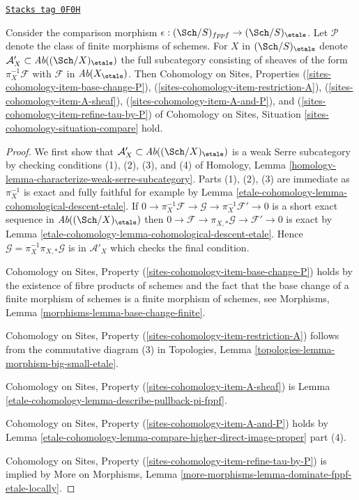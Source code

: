 \begin{lemma}
\label{etale-cohomology-lemma-compare-fppf-etale}
\href{https://stacks.math.columbia.edu/tag/0F0H}{\texttt{Stacks tag 0F0H}}

Consider the comparison morphism
$\epsilon : (\Sch/S)_{fppf} \to (\Sch/S)_\etale$.
Let $\mathcal{P}$ denote the class of finite morphisms of schemes.
For $X$ in $(\Sch/S)_\etale$ denote
$\mathcal{A}'_X \subset \textit{Ab}((\Sch/X)_\etale)$
the full subcategory consisting of sheaves of the form
$\pi_X^{-1}\mathcal{F}$ with $\mathcal{F}$ in $\textit{Ab}(X_\etale)$.
Then Cohomology on Sites, Properties
(\ref{sites-cohomology-item-base-change-P}),
(\ref{sites-cohomology-item-restriction-A}),
(\ref{sites-cohomology-item-A-sheaf}),
(\ref{sites-cohomology-item-A-and-P}), and
(\ref{sites-cohomology-item-refine-tau-by-P})
of Cohomology on Sites, Situation
\ref{sites-cohomology-situation-compare} hold.
\end{lemma}

\begin{proof}
We first show that $\mathcal{A}'_X \subset \textit{Ab}((\Sch/X)_\etale)$
is a weak Serre subcategory by checking conditions (1), (2), (3), and (4)
of Homology, Lemma \ref{homology-lemma-characterize-weak-serre-subcategory}.
Parts (1), (2), (3) are immediate as $\pi_X^{-1}$ is exact and
fully faithful for example by Lemma \ref{etale-cohomology-lemma-cohomological-descent-etale}. If
$0 \to \pi_X^{-1}\mathcal{F} \to \mathcal{G} \to \pi_X^{-1}\mathcal{F}' \to 0$
is a short exact sequence in $\textit{Ab}((\Sch/X)_\etale)$
then $0 \to \mathcal{F} \to \pi_{X, *}\mathcal{G} \to \mathcal{F}' \to 0$
is exact by Lemma \ref{etale-cohomology-lemma-cohomological-descent-etale}.
Hence $\mathcal{G} = \pi_X^{-1}\pi_{X, *}\mathcal{G}$ is in
$\mathcal{A}'_X$ which checks the final condition.

\medskip\noindent
Cohomology on Sites, Property (\ref{sites-cohomology-item-base-change-P}) holds
by the existence of fibre products of schemes
and the fact that the base change of a finite morphism of
schemes is a finite morphism of schemes, see
Morphisms, Lemma \ref{morphisms-lemma-base-change-finite}.

\medskip\noindent
Cohomology on Sites, Property (\ref{sites-cohomology-item-restriction-A})
follows from the commutative diagram (3) in
Topologies, Lemma \ref{topologies-lemma-morphism-big-small-etale}.

\medskip\noindent
Cohomology on Sites, Property (\ref{sites-cohomology-item-A-sheaf}) is
Lemma \ref{etale-cohomology-lemma-describe-pullback-pi-fppf}.

\medskip\noindent
Cohomology on Sites, Property (\ref{sites-cohomology-item-A-and-P}) holds by
Lemma \ref{etale-cohomology-lemma-compare-higher-direct-image-proper} part (4).

\medskip\noindent
Cohomology on Sites, Property (\ref{sites-cohomology-item-refine-tau-by-P})
is implied by
More on Morphisms, Lemma
\ref{more-morphisms-lemma-dominate-fppf-etale-locally}.
\end{proof}

